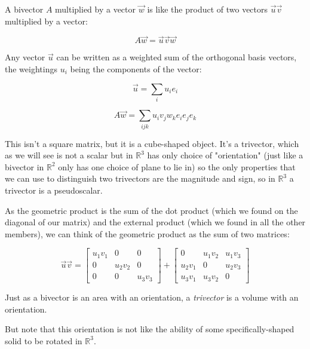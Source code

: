 A bivector $A$ multiplied by a vector $\vec{w}$ is like the product of two vectors $\vec{u}\vec{v}$ multiplied by a vector:

$$A\vec{w} = \vec{u}\vec{v}\vec{w} $$

Any vector $\vec{u}$ can be written as a weighted sum of the orthogonal basis vectors, the weightings $u_i$ being the components of the vector:

$$\vec{u} = \sum_i{u_i e_i}$$

$$A\vec{w} = \sum_{ijk}{u_i v_j w_k e_i e_j e_k}$$

This isn't a square matrix, but it is a cube-shaped object. It's a trivector, which as we will see is not a scalar but in $\mathbb{R}^3$ has only choice of "orientation" (just like a bivector in $\mathbb{R}^2$ only has one choice of plane to lie in) so the only properties that we can use to distinguish two trivectors are the magnitude and sign, so in $\mathbb{R}^3$ a trivector is a pseudoscalar.

As the geometric product is the sum of the dot product (which we found on the diagonal of our matrix) and the external product (which we found in all the other members), we can think of the geometric product as the sum of two matrices:

$$
\vec{u} \vec{v} =
\begin{bmatrix}
u_1 v_1 & 0 & 0 \\
0 & u_2 v_2 & 0 \\
0 & 0 & u_3 v_3
\end{bmatrix}
+
\begin{bmatrix}
0 & u_1 v_2 & u_1 v_3 \\
u_2 v_1 & 0 & u_2 v_3 \\
u_3 v_1 & u_3 v_2 & 0
\end{bmatrix}
$$

Just as a bivector is an area with an orientation, a \textit{trivector} is a volume with an orientation.

But note that this orientation is not like the ability of some specifically-shaped solid to be rotated in $\mathbb{R}^3$.

